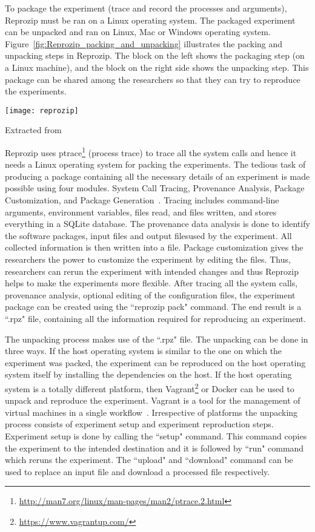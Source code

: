 To package the experiment (trace and record the processes and arguments), Reprozip must be ran on a Linux operating system. The packaged experiment can be unpacked and ran on Linux, Mac or Windows operating system. Figure~\ref{fig:Reprozip_packing_and_unpacking} illustrates the packing and unpacking steps in Reprozip. The block on the left shows the packaging step (on a Linux machine), and the block on the right side shows the unpacking step. This package can be shared among the researchers so that they can try to reproduce the experiments.

\begin{center}
\texttt{[image: reprozip]}
\label{fig:Reprozip_packing_and_unpacking}
\caption*{Extracted from \cite{Rampin2016}}
\end{center}

Reprozip uses ptrace\footnote{\url{http://man7.org/linux/man-pages/man2/ptrace.2.html}} (process trace) to trace all the system calls and hence it needs a Linux operating system for packing the experiments. The tedious task of producing a package containing all the necessary details of an experiment is made possible using four modules. System Call Tracing, Provenance Analysis, Package Customization, and Package Generation~\cite{Chirigati:2013:RUP:2482613.2482614}. Tracing includes command-line arguments, environment variables, files read, and files written, and stores everything in a SQLite database. The provenance data analysis is done to identify the software packages, input files and output filesused by the experiment. All collected information is then written into a file. Package customization gives the researchers the power to customize the experiment by editing the files. Thus, researchers can rerun the experiment with intended changes and thus Reprozip helps to make the experiments more flexible. After tracing all the system calls, provenance analysis, optional editing of the configuration files, the experiment package can be created using the ``reprozip pack" command. The end result is a ``.rpz" file, containing all the information required for reproducing an experiment.

The unpacking process makes use of the ``.rpz" file. The unpacking can be done in three ways. If the host operating system is similar to the one on which the experiment was packed, the experiment can be reproduced on the host operating system itself by installing the dependencies on the host. If the host operating system is a totally different platform, then Vagrant\footnote{\url{https://www.vagrantup.com/}} or Docker can be used to unpack and reproduce the experiment. Vagrant is a tool for the management of virtual machines in a single workflow~\cite{vagrant}. Irrespective of platforms the unpacking process consists of experiment setup and experiment reproduction steps. Experiment setup is done by calling the ``setup" command. This command copies the experiment to the intended destination and it is followed by ``run" command which reruns the experiment. The ``upload" and ``download" command can be used to replace an input file and download a processed file respectively.

